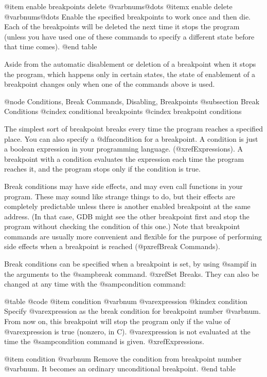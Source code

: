 @item enable breakpoints delete @var{bnums}@dots{}
@itemx enable delete @var{bnums}@dots{}
Enable the specified breakpoints to work once and then die.  Each of
the breakpoints will be deleted the next time it stops the program
(unless you have used one of these commands to specify a different
state before that time comes).
@end table

Aside from the automatic disablement or deletion of a breakpoint when it
stops the program, which happens only in certain states, the state of
enablement of a breakpoint changes only when one of the commands above
is used.

@node Conditions, Break Commands, Disabling, Breakpoints
@subsection Break Conditions
@cindex conditional breakpoints
@cindex breakpoint conditions

The simplest sort of breakpoint breaks every time the program reaches a
specified place.  You can also specify a @dfn{condition} for a
breakpoint.  A condition is just a boolean expression in your
programming language.  (@xref{Expressions}).  A breakpoint with a
condition evaluates the expression each time the program reaches it, and
the program stops only if the condition is true.

Break conditions may have side effects, and may even call functions in your
program.  These may sound like strange things to do, but their effects are
completely predictable unless there is another enabled breakpoint at the
same address.  (In that case, GDB might see the other breakpoint first and
stop the program without checking the condition of this one.)  Note that
breakpoint commands are usually more convenient and flexible for the
purpose of performing side effects when a breakpoint is reached
(@pxref{Break Commands}).

Break conditions can be specified when a breakpoint is set, by using
@samp{if} in the arguments to the @samp{break} command.  @xref{Set Breaks}.
They can also be changed at any time with the @samp{condition} command:

@table @code
@item condition @var{bnum} @var{expression}
@kindex condition
Specify @var{expression} as the break condition for breakpoint number
@var{bnum}.  From now on, this breakpoint will stop the program only if
the value of @var{expression} is true (nonzero, in C).  @var{expression}
is not evaluated at the time the @samp{condition} command is given.
@xref{Expressions}.

@item condition @var{bnum}
Remove the condition from breakpoint number @var{bnum}.  It becomes
an ordinary unconditional breakpoint.
@end table

